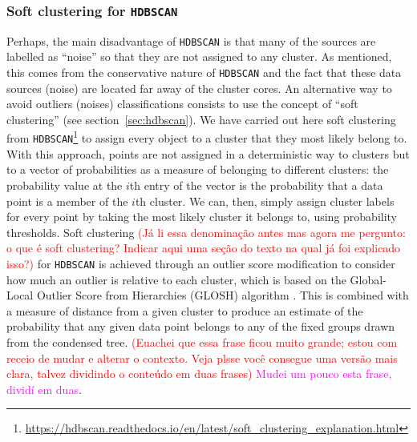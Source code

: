 \documentclass[fleqn,usenatbib]{mnras}
\newcommand{\comment}[1]{\textcolor{red}{#1}}
\newcommand{\luis}[1]{\textcolor{magenta}{#1}}
\begin{document}
\subsubsection{Soft clustering for \texttt{HDBSCAN}}

Perhaps, the main disadvantage of \texttt{HDBSCAN} is that many of the sources are labelled
as ``noise''
so that they are not assigned to any cluster. As mentioned,
this comes from the conservative nature of \texttt{HDBSCAN}
and the fact that these data sources (noise) are located far away of the cluster cores.
An alternative 
way
to avoid 
outliers (noises) classifications consists to use the concept 
of ``soft clustering'' (see section~\ref{sec:hdbscan}). We have carried out here soft
clustering 
from 
\texttt{HDBSCAN}\footnote{\url{https://hdbscan.readthedocs.io/en/latest/soft_clustering_explanation.html}} to assign every object to 
a cluster that they most likely belong to.
With this approach, points are not assigned in a deterministic way to clusters 
but to a vector of probabilities as a measure of belonging to different  clusters: the probability value at the $i$th entry of the vector
is the probability that a data point is a member of the $i$th cluster. 
We can, then, simply
assign cluster labels for every point by taking the most likely cluster it belongs to,
using probability thresholds. Soft clustering
\comment{(Já li essa denominação antes mas agora me pergunto: o que é soft clustering? Indicar aqui uma seção do texto na qual já foi explicado isso?)}
for \texttt{HDBSCAN} is achieved through an outlier score modification to 
consider how much an outlier is relative to each cluster, which is based on the
Global-Local Outlier Score from Hierarchies (GLOSH) algorithm \citep{Campello:2015}.
This is combined with a measure of distance from a given cluster to produce an estimate of the probability that any given data point belongs to any of the fixed groups drawn from the condensed tree. \comment{(Euachei que essa frase ficou muito grande; estou com receio de mudar e alterar o contexto. Veja plsse você consegue uma versão mais clara, talvez dividindo o conteúdo em duas frases)} \luis{Mudei um pouco esta frase, dividí em duas}.
\end{document}
